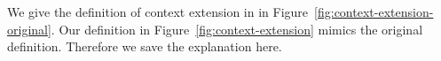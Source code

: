 We give the definition of context extension in \citet{dunfield2013complete} in
Figure~\ref{fig:context-extension-original}. Our definition in
Figure~\ref{fig:context-extension} mimics the original definition. Therefore we
save the explanation here.

